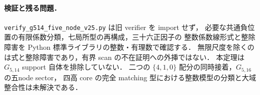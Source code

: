 \paragraph{検証と残る問題．}
\nolinkurl{verify_g514_five_node_v25.py} は旧 verifier を import せず，
必要な共通負位置の有限係数分類，七局所型の再構成，三十六正因子の
整数係数線形式と整除障害を Python 標準ライブラリの整数・有理数で確認する．
無限尺度を除くのは式と整除障害であり，有界 scan の不在証明への外挿ではない．
本定理は $G_{5,14}$ support 自体を排除していない．
二つの $\{4,1,0\}$ 配分の同時接着，$G_{5,16}$ の五node sector，
四高 core の完全 matching 型における整数模型の分類と大域整合性は未解決である．
